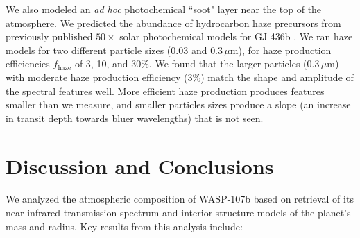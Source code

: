 \documentclass[twocolumn, trackchanges]{aastex61}
\begin{document}
We also modeled an \emph{ad hoc} photochemical ``soot" layer near the top of the atmosphere. We predicted the abundance of hydrocarbon haze precursors from previously published $50\times$ solar photochemical models for GJ 436b \citep{line11, morley17}. We ran haze models for two different particle sizes ($0.03$ and $0.3\,\mu$m), for haze production efficiencies $f_\mathrm{haze}$ of 3, 10, and 30\%. We found that the larger particles ($0.3\,\mu$m) with moderate haze production efficiency (3\%) match the shape and amplitude of the spectral features well. More efficient haze production produces features smaller than we measure, and smaller particles sizes produce a slope (an increase in transit depth towards bluer wavelengths) that is not seen.


\section{Discussion and Conclusions} \label{sec:discuss}
We analyzed the atmospheric composition of WASP-107b based on retrieval of its near-infrared transmission spectrum and interior structure models of the planet's mass and radius.  Key results from this analysis include:
\end{document}

